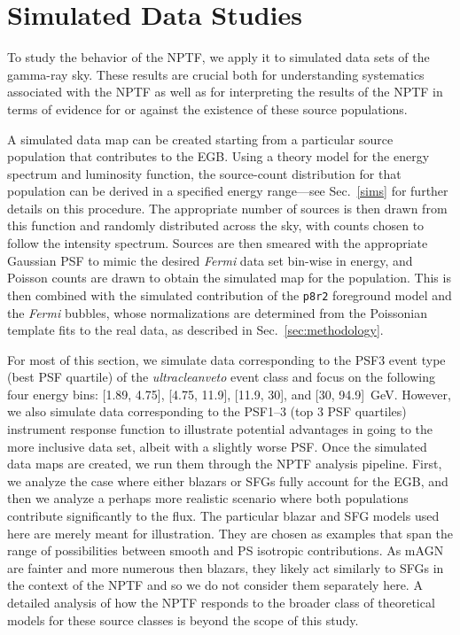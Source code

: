   
\section{Simulated Data Studies}
\label{sec:simulations}

To study the behavior of the NPTF, we apply it to simulated data sets of the gamma-ray sky.  These results are crucial both for understanding systematics associated with the NPTF as well as for interpreting the results of the NPTF in terms of evidence for or against the existence of these source populations. 

A simulated data map can be created starting from a particular source population that contributes to the EGB.  Using a theory model for the energy spectrum and luminosity function, the source-count distribution for that population can be derived in a specified energy range---see Sec.~\ref{sims} for further details on this procedure.  The appropriate number of sources is then drawn from this function and randomly distributed across the sky, with counts chosen to follow the intensity spectrum. Sources are then smeared with the appropriate Gaussian PSF to mimic the desired {\it Fermi} data set
bin-wise in energy, and Poisson counts are drawn to obtain the simulated map for the population.  This is then combined with the simulated contribution of the \texttt{p8r2} foreground model and the \emph{Fermi} bubbles, whose normalizations are determined from the Poissonian template fits to the real data, as described in Sec.~\ref{sec:methodology}.  

For most of this section, we simulate data corresponding to the PSF3 event type (best PSF quartile) of the \emph{ultracleanveto} event class and focus on the following four energy bins: [1.89, 4.75], [4.75, 11.9], [11.9, 30], and [30, 94.9]~GeV.
However, we also simulate data corresponding to the PSF1--3 (top 3 PSF quartiles) instrument response function to illustrate potential advantages in going to the more inclusive data set, albeit with a slightly worse PSF.   Once the simulated data maps are created, we run them through the NPTF analysis pipeline.  First, we analyze the case where either blazars or SFGs fully account for the EGB, and then we analyze a perhaps more realistic scenario where both populations contribute significantly to the flux.  The particular blazar and SFG models used here are merely meant for illustration.  They are chosen as examples that span the range of possibilities between smooth and PS isotropic contributions.  As mAGN are fainter and more numerous then blazars, they likely act similarly to SFGs in the context of the NPTF and so we do not consider them separately here.  A detailed analysis of how the NPTF responds to the broader class of theoretical models for these source classes is beyond the scope of this study.

